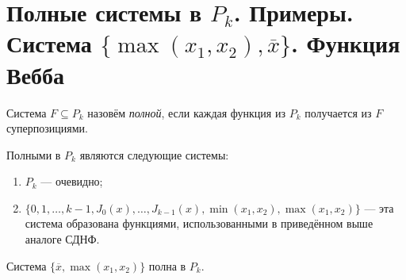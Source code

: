 \section{Полные системы в $P_k$. Примеры. Система $\{\max(x_1, x_2), \overline{x}\}$. Функция Вебба}

\begin{definition}
    Система $F \subseteq P_k$ назовём \textit{полной}, если каждая функция из $P_k$ получается из $F$ суперпозициями.
\end{definition}

\begin{example}
    Полными в $P_k$ являются следующие системы:
    \begin{enumerate}
        \item $P_k$ --- очевидно;
        \item $\{0, 1, \ldots, k - 1, J_0(x), \ldots, J_{k - 1}(x), \min(x_1, x_2), \max(x_1, x_2)\}$ --- эта система образована функциями, использованными в приведённом выше аналоге СДНФ.
    \end{enumerate}
\end{example}

\begin{theorem}
    Система $\{\overline{x}, \max(x_1, x_2)\}$ полна в $P_k$.
\end{theorem}

